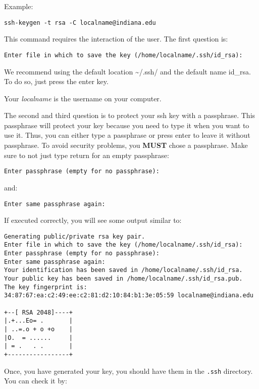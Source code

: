 Example:

\begin{verbatim}
ssh-keygen -t rsa -C localname@indiana.edu
\end{verbatim}

This command requires the interaction of the user. The first question
is:

\begin{verbatim}
Enter file in which to save the key (/home/localname/.ssh/id_rsa): 
\end{verbatim}

We recommend using the default location \textasciitilde{}/.ssh/ and the
default name id\_rsa. To do so, just press the enter key.

Your \emph{localname} is the username on your computer.

The second and third question is to protect your ssh key with a
passphrase. This passphrase will protect your key because you need to
type it when you want to use it. Thus, you can either type a passphrase
or press enter to leave it without passphrase. To avoid security
problems, you \textbf{MUST} chose a passphrase. Make sure to not just
type return for an empty passphrase:

\begin{verbatim}
Enter passphrase (empty for no passphrase):
\end{verbatim}

and:

\begin{verbatim}
Enter same passphrase again:
\end{verbatim}

If executed correctly, you will see some output similar to:

\begin{verbatim}
Generating public/private rsa key pair.
Enter file in which to save the key (/home/localname/.ssh/id_rsa): 
Enter passphrase (empty for no passphrase):
Enter same passphrase again:
Your identification has been saved in /home/localname/.ssh/id_rsa.
Your public key has been saved in /home/localname/.ssh/id_rsa.pub.
The key fingerprint is:
34:87:67:ea:c2:49:ee:c2:81:d2:10:84:b1:3e:05:59 localname@indiana.edu

+--[ RSA 2048]----+
|.+...Eo= .       |
| ..=.o + o +o    |
|O.  = ......     |
| = .   . .       |
+-----------------+
\end{verbatim}


Once, you have generated your key, you should have them in the \verb|.ssh|
directory. You can check it by:

